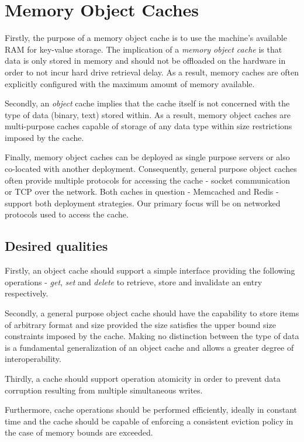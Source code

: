 \section{Memory Object Caches}

Firstly, the purpose of a memory object cache is to use the machine's available RAM for key-value storage. The implication of a \textit{memory object cache} is that data is only stored in memory and should not be offloaded on the hardware in order to not incur hard drive retrieval delay. As a result, memory caches are often explicitly configured with the maximum amount of memory available.

Secondly, an \textit{object} cache implies that the cache itself is not concerned with the type of data (binary, text) stored within. As a result, memory object caches are multi-purpose caches capable of storage of any data type within size restrictions imposed by the cache.

Finally, memory object caches can be deployed as single purpose servers or also co-located with another deployment. Consequently, general purpose object caches often provide multiple protocols for accessing the cache - socket communication or TCP over the network. Both caches in question - Memcached and Redis - support both deployment strategies. Our primary focus will be on networked protocols used to access the cache.


\subsection{Desired qualities}
Firstly, an object cache should support a simple interface providing the following operations - \textit{get}, \textit{set} and \textit{delete} to retrieve, store and invalidate an entry respectively.

Secondly, a general purpose object cache should have the capability to store items of arbitrary format and size provided the size satisfies the upper bound size constraints imposed by the cache. Making no distinction between the type of data is a fundamental generalization of an object cache and allows a greater degree of interoperability.

Thirdly, a cache should support operation atomicity in order to prevent data corruption resulting from multiple simultaneous writes.

Furthermore, cache operations should be performed efficiently, ideally in constant time and the cache should be capable of enforcing a consistent eviction policy in the case of memory bounds are exceeded.

